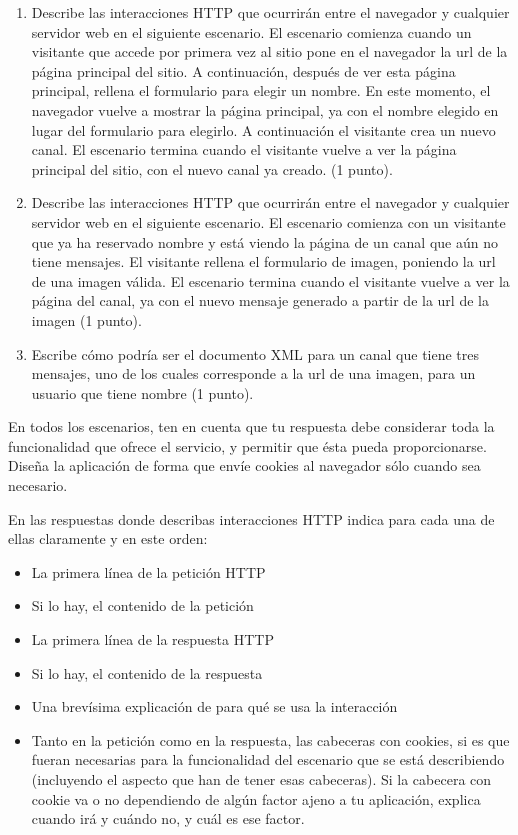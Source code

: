 {\begin{enumerate}
\item Describe las interacciones HTTP que ocurrirán entre el navegador y cualquier servidor web en el siguiente escenario. El escenario comienza cuando un visitante que accede por primera vez al sitio pone en el navegador la url de la página principal del sitio. A continuación, después de ver esta página principal, rellena el formulario para elegir un nombre. En este momento, el navegador vuelve a mostrar la página principal, ya con el nombre elegido en lugar del formulario para elegirlo. A continuación el visitante crea un nuevo canal. El escenario termina cuando el visitante vuelve a ver la página principal del sitio, con el nuevo canal ya creado. (1 punto).

\item Describe las interacciones HTTP que ocurrirán entre el navegador y cualquier servidor web en el siguiente escenario. El escenario comienza con un visitante que ya ha reservado nombre y está viendo la página de un canal que aún no tiene mensajes. El visitante rellena el formulario de imagen, poniendo la url de una imagen válida. El escenario termina cuando el visitante vuelve a ver la página del canal, ya con el nuevo mensaje generado a partir de la url de la imagen (1 punto).

\item Escribe cómo podría ser el documento XML para un canal que tiene tres mensajes, uno de los cuales corresponde a la url de una imagen, para un usuario que tiene nombre (1 punto).
\end{enumerate}

En todos los escenarios, ten en cuenta que tu respuesta debe considerar toda la funcionalidad que ofrece el servicio, y permitir que ésta pueda proporcionarse. Diseña la aplicación de forma que envíe cookies al navegador sólo cuando sea necesario.

En las respuestas donde describas interacciones HTTP indica para cada una de ellas claramente y en este orden:
  \begin{itemize}
  \item La primera línea de la petición HTTP
  \item Si lo hay, el contenido de la petición
  \item La primera línea de la respuesta HTTP
  \item Si lo hay, el contenido de la respuesta
  \item Una brevísima explicación de para qué se usa la interacción
  \item Tanto en la petición como en la respuesta, las cabeceras con cookies, si es que fueran necesarias para la funcionalidad del escenario que se está describiendo (incluyendo el aspecto que han de tener esas cabeceras). Si la cabecera con cookie va o no dependiendo de algún factor ajeno a tu aplicación, explica cuando irá y cuándo no, y cuál es ese factor.
  \end{itemize}

}
